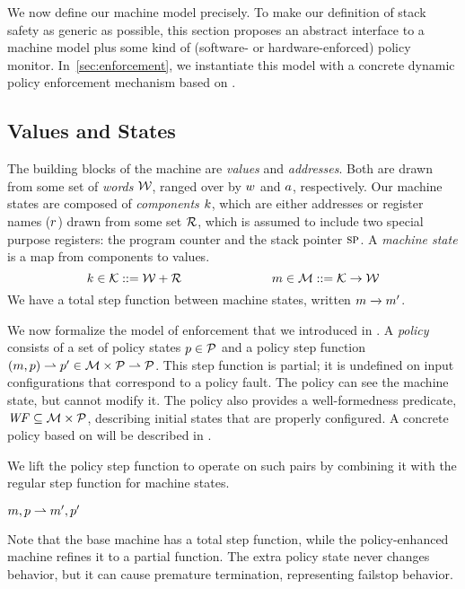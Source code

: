 \documentclass[acmsmall,review,anonymous]{acmart}\settopmatter{printfolios=true,printccs=false,printacmref=false}
\begin{document}
We now define our machine model precisely. To make our definition of stack safety
as generic as possible, this section proposes an abstract interface to a
machine model plus some kind of (software- or hardware-enforced) policy monitor.
In~\cref{sec:enforcement}, we instantiate this model with a concrete dynamic
policy enforcement mechanism based on \citet{DBLP:conf/sp/RoesslerD18}.

\subsection{Values and States}

The building blocks of the machine are {\em values} and {\em addresses}.
Both are drawn from some set of {\em words} \({\mathcal W}\), ranged over by \(w\) and
\(a\), respectively.
%
Our machine states are composed of {\em components} \(k\),
which are either addresses or register names (\(r\)) drawn from some set
\({\mathcal R}\), which is assumed to include two special purpose registers: the
program counter {\PCname} and the stack pointer \(\textsc{sp}\).
A {\em machine state} is a map from components to values.
%
    \[k \in {\mathcal K} ::= {\mathcal W} + {\mathcal R}  \hspace{1in}
    m \in {\mathcal M} ::= {\mathcal K} \rightarrow {\mathcal W}\]
%
We have a total step function between machine states, written \(m \xrightarrow{} m'\).

We now formalize the model of enforcement that we introduced in .
A {\em policy} consists of a set of policy
states \(p \in \mathcal{P}\) and a policy step function \((m, p) \rightharpoonup p' \in
{\mathcal M} \times \mathcal{P} \rightharpoonup \mathcal{P}\). This step function is partial;
it is undefined on input configurations that correspond to a policy fault. The policy
can see the machine state, but cannot modify it. The policy also provides a
well-formedness predicate, \(\mathit{WF} \subseteq {\mathcal M} \times \mathcal{P}\), describing
initial states that are properly configured.
%
A concrete policy based on \citet{DBLP:conf/sp/RoesslerD18} will be described in
.

We lift the policy step function to operate on such pairs
by combining it with the regular step function for machine states.

            {\(m,p \overset{}{\rightharpoonup}
               m',p'\)}

\noindent
Note that the base machine has a total step function, while the policy-enhanced machine
refines it to a partial function. The extra policy state never changes behavior,
but it can cause
premature termination, representing failstop behavior.
\end{document}
